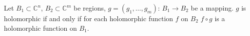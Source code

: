 Let $B_1 \subset \mathbb{C}^n$, $B_2 \subset \mathbb{C}^m$ be regions, $g = (g_1, \ldots, g_m)$: $B_1 \to B_2$ be a mapping. $g$ is holomorphic if and only if for each holomorphic function $f$ on $B_2$ $f \circ g$ is a holomorphic function on $B_1$.

